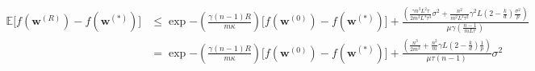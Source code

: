 
\begin{align}
                \mathbb{E}\Big[f({\boldsymbol{w}}^{(R)})-f({\boldsymbol{w}}^{(*)})\Big]&\leq \exp{-\left(\frac{\gamma\left(n-1\right) R}{m\kappa}\right) }\Big[f({\boldsymbol{w}}^{(0)})-f({\boldsymbol{w}}^{(*)})\Big]+\frac{\left(\frac{\gamma n^3L^2\tau}{2m^3L^3\tau^3}\sigma^2+\frac{n^2}{m^2L^2\tau^2}\gamma^2 L\left(2-\frac{k}{d}\right)\frac{\sigma^2}{p} \right)}{\mu\gamma\left(\frac{n-1}{mL\tau}\right)}\nonumber\\
                &=\exp{-\left(\frac{\gamma\left(n-1\right) R}{m\kappa}\right) }\Big[f({\boldsymbol{w}}^{(0)})-f({\boldsymbol{w}}^{(*)})\Big]+\frac{\left(\frac{ n^3}{2m^2}+\frac{n^2}{m}\gamma L\left(2-\frac{k}{d}\right)\frac{1}{p} \right)}{\mu\tau\left(n-1\right)}\sigma^2
\end{align}
